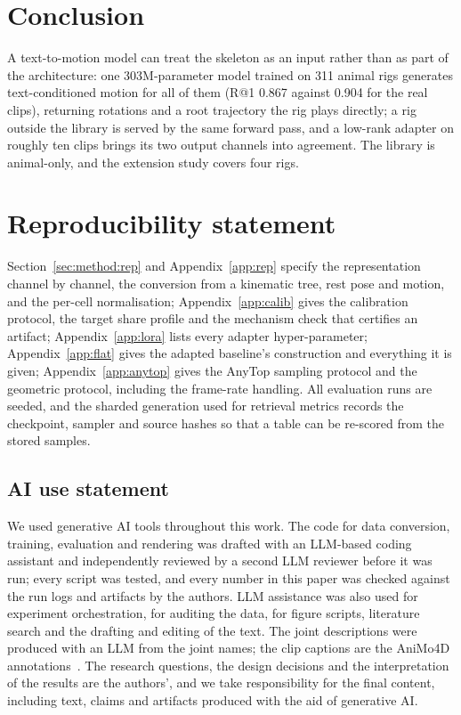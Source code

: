 \section{Conclusion}\label{sec:conclusion}

A text-to-motion model can treat the skeleton as an input rather than as part of the architecture:
one \num{303}M-parameter model trained on \num{311} animal rigs generates text-conditioned motion for
all of them (R@1 \num{0.867} against \num{0.904} for the real clips), returning rotations and a root
trajectory the rig plays directly; a rig outside the library is served by the same forward pass, and a
low-rank adapter on roughly ten clips brings its two output channels into agreement. The library is
animal-only, and the extension study covers four rigs.

\section*{Reproducibility statement}

Section~\ref{sec:method:rep} and Appendix~\ref{app:rep} specify the representation channel by
channel, the conversion from a kinematic tree, rest pose and motion, and the per-cell
normalisation; Appendix~\ref{app:calib} gives the calibration protocol, the target share profile
and the mechanism check that certifies an artifact; Appendix~\ref{app:lora} lists every adapter
hyper-parameter; Appendix~\ref{app:flat} gives the adapted baseline's construction and everything it is
given; Appendix~\ref{app:anytop} gives the AnyTop sampling protocol and the geometric
protocol, including the frame-rate handling. All evaluation runs are seeded, and the sharded
generation used for retrieval metrics records the checkpoint, sampler and source hashes so that
a table can be re-scored from the stored samples.

\subsection*{AI use statement}
We used generative AI tools throughout this work. The code for data conversion, training, evaluation
and rendering was drafted with an LLM-based coding assistant and independently reviewed by a second
LLM reviewer before it was run; every script was tested, and every number in this paper was checked
against the run logs and artifacts by the authors. LLM assistance was also used for experiment
orchestration, for auditing the data, for figure scripts, literature search
and the drafting and editing of the text. The joint descriptions were produced with an LLM from the joint names; the clip captions are the
AniMo4D annotations~\citep{wang2025animo}. The research
questions, the design decisions and the interpretation of the results are the authors', and we take
responsibility for the final content, including text, claims and artifacts produced with the aid of
generative AI.

